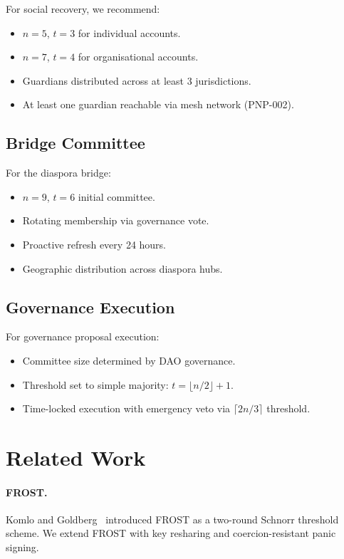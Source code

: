 \documentclass[11pt,a4paper]{article}
\begin{document}
For social recovery, we recommend:
\begin{itemize}
    \item $n = 5$, $t = 3$ for individual accounts.
    \item $n = 7$, $t = 4$ for organisational accounts.
    \item Guardians distributed across at least 3 jurisdictions.
    \item At least one guardian reachable via mesh network (PNP-002).
\end{itemize}

\subsection{Bridge Committee}

For the diaspora bridge:
\begin{itemize}
    \item $n = 9$, $t = 6$ initial committee.
    \item Rotating membership via governance vote.
    \item Proactive refresh every 24 hours.
    \item Geographic distribution across diaspora hubs.
\end{itemize}

\subsection{Governance Execution}

For governance proposal execution:
\begin{itemize}
    \item Committee size determined by DAO governance.
    \item Threshold set to simple majority: $t = \lfloor n/2 \rfloor + 1$.
    \item Time-locked execution with emergency veto via
    $\lceil 2n/3 \rceil$ threshold.
\end{itemize}

\section{Related Work}
\label{sec:related}

\paragraph{FROST.}  Komlo and Goldberg~\cite{komlo2020frost} introduced
FROST as a two-round Schnorr threshold scheme.  We extend FROST with
key resharing and coercion-resistant panic signing.
\end{document}
